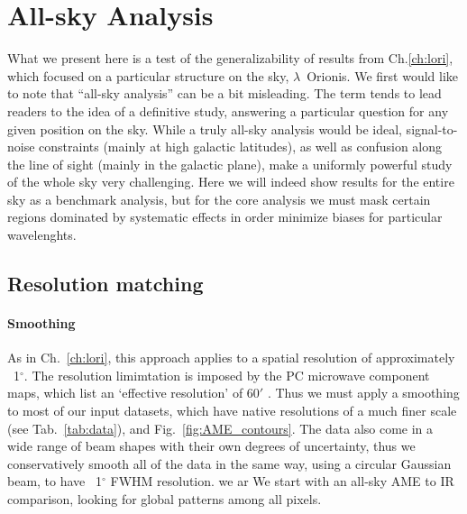 \chapter{All-sky Analysis}
  \label{sec:analysis}
    What we present here is a test of the generalizability of results from Ch.\ref{ch:lori}, which focused on a particular structure on the sky, $\lambda$~Orionis.
    We first would like to note that ``all-sky analysis'' can be a bit misleading. The term tends to lead readers to the idea of a definitive study, answering a particular question for any given position on the sky.  While a truly all-sky analysis would be ideal, signal-to-noise constraints (mainly at high galactic latitudes), as well as confusion along the line of sight (mainly in the galactic plane), make a uniformly powerful study of the whole sky very challenging. Here we will indeed show results for the entire sky as a benchmark analysis, but for the core analysis we must mask certain regions dominated by systematic effects in order minimize biases for particular wavelenghts.

\section{Resolution matching}
    \subsubsection{Smoothing}
        As in Ch.~\ref{ch:lori}, this approach applies to a spatial resolution of approximately ~1$^{\circ}$. The resolution limimtation is imposed by the PC microwave component maps, which list an `effective resolution' of 60$'$ \citep{planck15X}. Thus we must apply a smoothing to most of our input datasets, which have native resolutions of a much finer scale (see Tab.~\ref{tab:data}), and Fig.~\ref{fig:AME_contours}. The data also come in a wide range of beam shapes with their own degrees of uncertainty, thus we conservatively smooth all of the data in the same way, using a circular Gaussian beam, to have ~1$^{\circ}$ FWHM resolution. we ar We start with an all-sky AME to IR comparison, looking for global patterns among all pixels.


